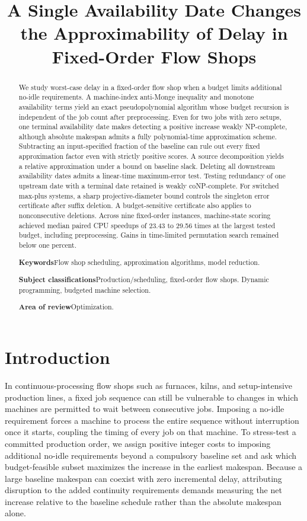 \documentclass[11pt,letterpaper]{article}
\title{A Single Availability Date Changes the Approximability of Delay in Fixed-Order Flow Shops}
\author{}
\date{}
\begin{document}
\onehalfspacing
\maketitle

\begin{abstract}
We study worst-case delay in a fixed-order flow shop when a budget limits additional no-idle requirements. A machine-index anti-Monge inequality and monotone availability terms yield an exact pseudopolynomial algorithm whose budget recursion is independent of the job count after preprocessing. Even for two jobs with zero setups, one terminal availability date makes detecting a positive increase weakly NP-complete, although absolute makespan admits a fully polynomial-time approximation scheme. Subtracting an input-specified fraction of the baseline can rule out every fixed approximation factor even with strictly positive scores. A source decomposition yields a relative approximation under a bound on baseline slack. Deleting all downstream availability dates admits a linear-time maximum-error test. Testing redundancy of one upstream date with a terminal date retained is weakly coNP-complete. For switched max-plus systems, a sharp projective-diameter bound controls the singleton error certificate after suffix deletion. A budget-sensitive certificate also applies to nonconsecutive deletions. Across nine fixed-order instances, machine-state scoring achieved median paired CPU speedups of 23.43 to 29.56 times at the largest tested budget, including preprocessing. Gains in time-limited permutation search remained below one percent.

\medskip
\noindent\textbf{Keywords}\enspace Flow shop scheduling, approximation algorithms, model reduction.\par
\noindent\textbf{Subject classifications}\enspace Production/scheduling, fixed-order flow shops. Dynamic programming, budgeted machine selection.\par
\noindent\textbf{Area of review}\enspace Optimization.
\end{abstract}

\section*{Introduction}

In continuous-processing flow shops such as furnaces, kilns, and setup-intensive production lines, a fixed job sequence can still be vulnerable to changes in which machines are permitted to wait between consecutive jobs. Imposing a no-idle requirement forces a machine to process the entire sequence without interruption once it starts, coupling the timing of every job on that machine. To stress-test a committed production order, we assign positive integer costs to imposing additional no-idle requirements beyond a compulsory baseline set and ask which budget-feasible subset maximizes the increase in the earliest makespan. Because a large baseline makespan can coexist with zero incremental delay, attributing disruption to the added continuity requirements demands measuring the net increase relative to the baseline schedule rather than the absolute makespan alone.
\end{document}
